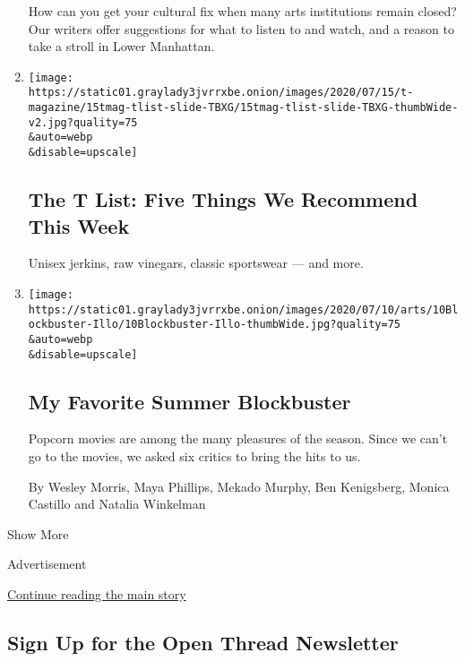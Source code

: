 \begin{enumerate}
  How can you get your cultural fix when many arts institutions remain
  closed? Our writers offer suggestions for what to listen to and watch,
  and a reason to take a stroll in Lower Manhattan.
\item
  \href{/2020/07/16/t-magazine/margo-price-album-tlist.html}{}

  \texttt{[image: https://static01.graylady3jvrrxbe.onion/images/2020/07/15/t-magazine/15tmag-tlist-slide-TBXG/15tmag-tlist-slide-TBXG-thumbWide-v2.jpg?quality=75\\\&auto=webp\\\&disable=upscale]}

  \hypertarget{the-t-list-five-things-we-recommend-this-week-3}{%
  \subsection{The T List: Five Things We Recommend This
  Week}\label{the-t-list-five-things-we-recommend-this-week-3}}

  Unisex jerkins, raw vinegars, classic sportswear --- and more.
\item
  \href{/2020/07/09/movies/summer-movies-blockbusters.html}{}

  \texttt{[image: https://static01.graylady3jvrrxbe.onion/images/2020/07/10/arts/10Blockbuster-Illo/10Blockbuster-Illo-thumbWide.jpg?quality=75\\\&auto=webp\\\&disable=upscale]}

  \hypertarget{my-favorite-summer-blockbuster}{%
  \subsection{My Favorite Summer
  Blockbuster}\label{my-favorite-summer-blockbuster}}

  Popcorn movies are among the many pleasures of the season. Since we
  can't go to the movies, we asked six critics to bring the hits to us.

  By Wesley Morris, Maya Phillips, Mekado Murphy, Ben Kenigsberg, Monica
  Castillo and Natalia Winkelman
\end{enumerate}

Show More

Advertisement

\protect\hyperlink{after-mid2}{Continue reading the main story}

\hypertarget{sign-up-for-the-open-thread-newsletter}{%
\subsection{Sign Up for the Open Thread
Newsletter}\label{sign-up-for-the-open-thread-newsletter}}

